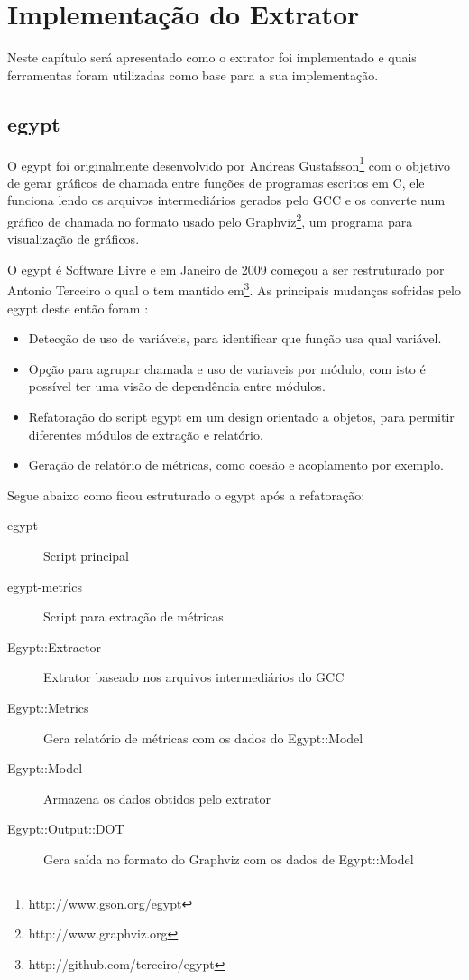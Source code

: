 \chapter{Implementação do Extrator} \label{ch:implementacao}

Neste capítulo será apresentado como o extrator foi implementado e quais
ferramentas foram utilizadas como base para a sua implementação.

\section{egypt} \label{sec:egypt}

O egypt foi originalmente desenvolvido por Andreas
Gustafsson\footnote{http://www.gson.org/egypt} com o objetivo de gerar gráficos
de chamada entre funções de programas escritos em C, ele funciona lendo os
arquivos intermediários gerados pelo GCC e os
converte num gráfico de chamada no formato usado pelo
Graphviz\footnote{http://www.graphviz.org}, um programa para visualização de
gráficos.

O egypt é Software Livre e em Janeiro de 2009 começou a ser restruturado por
Antonio Terceiro o qual o tem mantido
em\footnote{http://github.com/terceiro/egypt}. As principais mudanças sofridas
pelo egypt deste então foram \cite{structuralComplexityEvolution}:

\begin{itemize}
\item Detecção de uso de variáveis, para identificar que função usa qual
variável.
\item Opção para agrupar chamada e uso de variaveis por módulo, com isto é
possível ter uma visão de dependência entre módulos.
\item Refatoração do script egypt em um design orientado a objetos, para
permitir diferentes módulos de extração e relatório.
\item Geração de relatório de métricas, como coesão e acoplamento por exemplo.
\end{itemize}

Segue abaixo como ficou estruturado o egypt após a refatoração:

\begin{description}
\item[egypt] Script principal
\item[egypt-metrics] Script para extração de métricas
\item[Egypt::Extractor] Extrator baseado nos arquivos intermediários do GCC
\item[Egypt::Metrics] Gera relatório de métricas com os dados do Egypt::Model
\item[Egypt::Model] Armazena os dados obtidos pelo extrator
\item[Egypt::Output::DOT] Gera saída no formato do Graphviz com os dados de Egypt::Model
\end{description}

